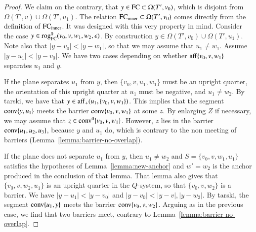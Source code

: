 \begin{proof}
We claim on the contrary, that $y\in {\operatorname{FC}}\subset \Omega(T',v_0)$, which is disjoint
from $\Omega(T',v)\cup\Omega(T',u_1)$.
The relation ${\operatorname{FC}}_{\text{inner}}\subset\Omega(T',v_0)$ comes directly from the
definition of ${\operatorname{FC}}_{\text{inner}}$.  It was designed with this very property in mind.
Consider the case $y\in{\operatorname{rog}}^0_{\text{FC}}(v_0,v,w_1,w_2,\epsilon)$.  By construction
$y\in \Omega(T',v_0)\cup\Omega(T',u_1)$.  Note also that $|y-v_0|<|y-w_1|$,
so that we may assume that $u_1\ne w_1$.  Assume $|y-u_1|<|y-v_0|$.
We have two cases depending on whether ${\operatorname{aff}}\{v_0,v,w_1\}$ separates
$u_1$ and $y$.  

If the plane separates $u_1$ from $y$, then
$\{v_0,v,u_1,w_1\}$ must be an upright quarter, the orientation of this
upright quarter at $u_1$ must be negative, and $u_1\ne w_2$.
By tarski,
we have that $y\in{\operatorname{aff}}_+(u_1,\{v_0,v,w_1\})$.  This implies that
the segment ${\operatorname{conv}}\{y,u_1\}$ meets the barrier ${\operatorname{conv}}\{v_0,v,w_1\}$
at some $z$.  By enlarging $Z$ if necessary, we may assume that 
$z\in{\operatorname{conv}}^0\{v_0,v,w_1\}$.
However, $z$ lies in the barrier ${\operatorname{conv}}\{u_1,u_2,u_3\}$, because
$y$ and $u_1$ do,
which is contrary to the non meeting of barriers (Lemma~\ref{lemma:barrier-no-overlap}).

If the plane does not separate $u_1$ from $y$, then $u_1\ne w_2$ and 
$S = \{v_0,v,w_1,u_1\}$ satisfies the hypotheses of Lemma~\ref{lemma:new-anchor} and $w'=w_2$ is the anchor produced in the conclusion of that lemma.
That lemma also gives that $\{v_0,v,w_2,u_1\}$ is an upright quarter in
the $Q$-system, so that $\{v_0,v,w_2\}$ is a barrier.
We have $|y-u_1|<|y-v_0|$ and $|y-v_0|<|y-v|,|y-w_2|$.
By tarski, the segment ${\operatorname{conv}}\{u_1,y\}$
meets the barrier ${\operatorname{conv}}\{v_0,v,w_2\}$.  Arguing as in the previous
case, we find that two barriers meet, contrary to Lemma~\ref{lemma:barrier-no-overlap}.
%
%
\end{proof}

